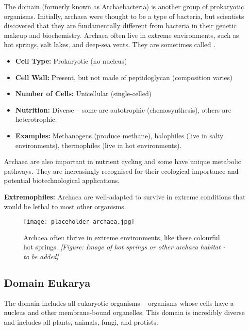 The domain  (formerly known as Archaebacteria) is another group of prokaryotic organisms.  Initially, archaea were thought to be a type of bacteria, but scientists discovered that they are fundamentally different from bacteria in their genetic makeup and biochemistry.  Archaea often live in extreme environments, such as hot springs, salt lakes, and deep-sea vents. They are sometimes called .

\begin{itemize}
    \item \textbf{Cell Type:} Prokaryotic (no nucleus)
    \item \textbf{Cell Wall:} Present, but not made of peptidoglycan (composition varies)
    \item \textbf{Number of Cells:} Unicellular (single-celled)
    \item \textbf{Nutrition:} Diverse – some are autotrophic (chemosynthesis), others are heterotrophic.
    \item \textbf{Examples:} Methanogens (produce methane), halophiles (live in salty environments), thermophiles (live in hot environments).
\end{itemize}

Archaea are also important in nutrient cycling and some have unique metabolic pathways.  They are increasingly recognised for their ecological importance and potential biotechnological applications.

\begin{marginnote}
\textbf{Extremophiles:} Archaea are well-adapted to survive in extreme conditions that would be lethal to most other organisms.
\end{marginnote}

\begin{figure}
\centering
\texttt{[image: placeholder-archaea.jpg]}
\caption{Archaea often thrive in extreme environments, like these colourful hot springs. \textit{[Figure: Image of hot springs or other archaea habitat - to be added]}}
\end{figure}


\subsection{Domain Eukarya}

The domain  includes all eukaryotic organisms – organisms whose cells have a nucleus and other membrane-bound organelles.  This domain is incredibly diverse and includes all plants, animals, fungi, and protists.

